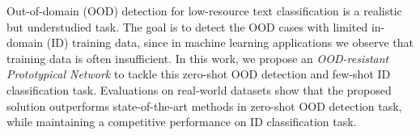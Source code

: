 Out-of-domain (OOD) detection for low-resource text classification is a realistic but understudied task. The goal is to detect the OOD cases with limited in-domain (ID) training data, since in machine learning applications we observe that training data is often insufficient. In this work, we propose an \emph{OOD-resistant Prototypical Network} to tackle this zero-shot OOD detection and few-shot ID classification task. Evaluations on real-world datasets show that the proposed solution outperforms state-of-the-art methods in zero-shot OOD detection task, while maintaining a competitive performance on ID classification task.